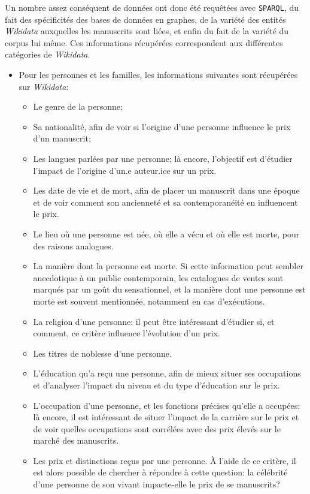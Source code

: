 \documentclass[a4paper, 12pt, twoside]{book}
\newcommand{\sparql}{\texttt{\gls{SPARQL}}}
\newcommand{\wkd}{\textit{Wikidata}}
\begin{document}
Un nombre assez conséquent de données ont donc été requêtées avec \sparql{}, du fait des spécificités des bases de données en graphes, de la variété des entités \wkd{} auxquelles les manuscrits sont liées, et enfin du fait de la variété du corpus lui même. Ces informations récupérées correspondent aux différentes catégories de \wkd{}.
\begin{itemize}
	\item Pour les personnes et les familles, les informations suivantes sont récupérées sur \wkd{}:
	\begin{itemize}
		\item Le genre de la personne;
		\item Sa nationalité, afin de voir si l'origine d'une personne influence le prix d'un manuscrit;
		\item Les langues parlées par une personne; là encore, l'objectif est d'étudier l'impact de l'origine d'un.e auteur.ice sur un prix.
		\item Les date de vie et de mort, afin de placer un manuscrit dans une époque et de voir comment son ancienneté et sa contemporanéité en influencent le prix.
		\item Le lieu où une personne est née, où elle a vécu et où elle est morte, pour des raisons analogues.
		\item La manière dont la personne est morte. Si cette information peut sembler anecdotique à un public contemporain, les catalogues de ventes sont marqués par un goût du sensationnel, et la manière dont une personne est morte est souvent mentionnée, notamment en cas d'exécutions.
		\item La religion d'une personne: il peut être intéressant d'étudier si, et comment, ce critère influence l'évolution d'un prix.
		\item Les titres de noblesse d'une personne.
		\item L'éducation qu'a reçu une personne, afin de mieux situer ses occupations et d'analyser l'impact du niveau et du type d'éducation sur le prix.
		\item L'occupation d'une personne, et les fonctions précises qu'elle a occupées: là encore, il est intéressant de situer l'impact de la carrière sur le prix et de voir quelles occupations sont corrélées avec des prix élevés sur le marché des manuscrits.
		\item Les prix et distinctions reçus par une personne. À l'aide de ce critère, il est alors possible de chercher à répondre à cette question: la célébrité d'une personne de son vivant impacte-elle le prix de se manuscrits?

\end{itemize}
\end{itemize}
\end{document}
